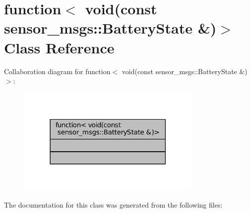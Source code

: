 \hypertarget{classstd_1_1function_3_01void_07const_01sensor__msgs_1_1BatteryState_01_6_08_4}{}\section{function$<$ void(const sensor\+\_\+msgs\+:\+:Battery\+State \&)$>$ Class Reference}
\label{classstd_1_1function_3_01void_07const_01sensor__msgs_1_1BatteryState_01_6_08_4}


Collaboration diagram for function$<$ void(const sensor\+\_\+msgs\+:\+:Battery\+State \&)$>$\+:
\nopagebreak
\begin{figure}[H]
\begin{center}
\leavevmode
\includegraphics[width=254pt]{classstd_1_1function_3_01void_07const_01sensor__msgs_1_1BatteryState_01_6_08_4__coll__graph}
\end{center}
\end{figure}


The documentation for this class was generated from the following files\+: